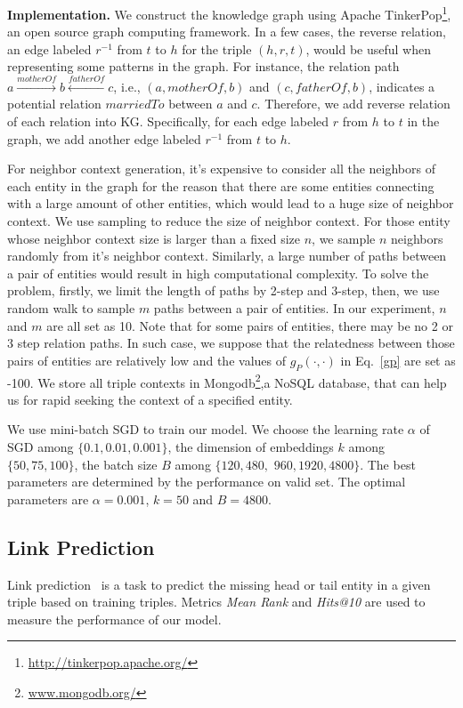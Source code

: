 \textbf{Implementation.}
We construct the knowledge graph using Apache TinkerPop\footnote{\url{http://tinkerpop.apache.org/}}, an open source graph computing framework. In a few cases, the reverse relation, an edge labeled $r^{-1}$ from $t$ to $h$ for the triple $(h,r,t)$, would be useful when representing some patterns in the graph. For instance, the relation path $a \xrightarrow{motherOf} b \xleftarrow{fatherOf} c$, i.e., $(a, motherOf, b)$ and $(c, fatherOf, b)$, indicates a potential relation $marriedTo$ between $a$ and $c$. Therefore, we add reverse relation of each relation into KG. Specifically, for each edge labeled $r$ from $h$ to $t$ in the graph, we add another edge labeled $r^{-1}$ from $t$ to $h$.

For neighbor context generation, it's expensive to consider all the neighbors of each entity in the graph for the reason that there are some entities connecting with a large amount of other entities, which would lead to a huge size of neighbor context. We use sampling to reduce the size of neighbor context. For those entity whose neighbor context size is larger than a fixed size $n$, we sample $n$ neighbors randomly from it's neighbor context. Similarly, a large number of paths between a pair of entities would result in high computational complexity. To solve the problem, firstly, we limit the length of paths by 2-step and 3-step, then, we use random walk to sample $m$ paths between a pair of entities. In our experiment, $n$ and $m$ are all set as 10. Note that for some pairs of entities, there may be no 2 or 3 step relation paths. In such case, we suppose that the relatedness between those pairs of entities are relatively low and the values of $g_P(\cdot, \cdot)$ in Eq.~\eqref{gp} are set as -100. We store all triple contexts in Mongodb\footnote{\url{www.mongodb.org/}},a NoSQL database, that can help us for rapid seeking the context of a specified entity.


We use mini-batch SGD to train our model. We choose the learning rate $\alpha$ of SGD among $\{0.1, 0.01, 0.001\}$, the dimension of embeddings $k$ among $\{50, 75, 100\}$, the batch size $B$ among $\{120, 480,$ $ 960, 1920, 4800\}$. The best parameters are determined by the performance on valid set. The optimal parameters are $\alpha=0.001$, $k=50$ and $B=4800$.

\subsection{Link Prediction}
Link prediction~\cite{BordesUGWY13} is a task to predict the missing head or tail entity in a given triple based on training triples. Metrics \textit{Mean Rank} and \textit{Hits@10} are used to measure the performance of our model.


